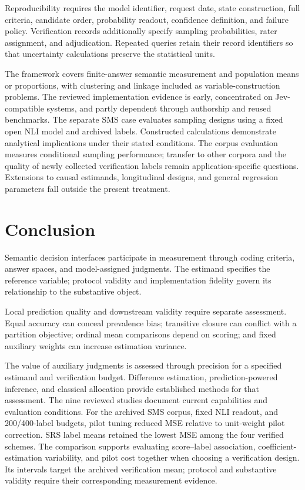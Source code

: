 \documentclass[11pt,a4paper]{article}
\begin{document}
Reproducibility requires the model identifier, request date, state construction, full criteria, candidate order, probability readout, confidence definition, and failure policy. Verification records additionally specify sampling probabilities, rater assignment, and adjudication. Repeated queries retain their record identifiers so that uncertainty calculations preserve the statistical units.

The framework covers finite-answer semantic measurement and population means or proportions, with clustering and linkage included as variable-construction problems. The reviewed implementation evidence is early, concentrated on Jev-compatible systems, and partly dependent through authorship and reused benchmarks. The separate SMS case evaluates sampling designs using a fixed open NLI model and archived labels. Constructed calculations demonstrate analytical implications under their stated conditions. The corpus evaluation measures conditional sampling performance; transfer to other corpora and the quality of newly collected verification labels remain application-specific questions. Extensions to causal estimands, longitudinal designs, and general regression parameters fall outside the present treatment.

\section{Conclusion}

Semantic decision interfaces participate in measurement through coding criteria, answer spaces, and model-assigned judgments. The estimand specifies the reference variable; protocol validity and implementation fidelity govern its relationship to the substantive object.

Local prediction quality and downstream validity require separate assessment. Equal accuracy can conceal prevalence bias; transitive closure can conflict with a partition objective; ordinal mean comparisons depend on scoring; and fixed auxiliary weights can increase estimation variance.

The value of auxiliary judgments is assessed through precision for a specified estimand and verification budget. Difference estimation, prediction-powered inference, and classical allocation provide established methods for that assessment. The nine reviewed studies document current capabilities and evaluation conditions. For the archived SMS corpus, fixed NLI readout, and 200/400-label budgets, pilot tuning reduced MSE relative to unit-weight pilot correction. SRS label means retained the lowest MSE among the four verified schemes. The comparison supports evaluating score--label association, coefficient-estimation variability, and pilot cost together when choosing a verification design. Its intervals target the archived verification mean; protocol and substantive validity require their corresponding measurement evidence.
\end{document}
